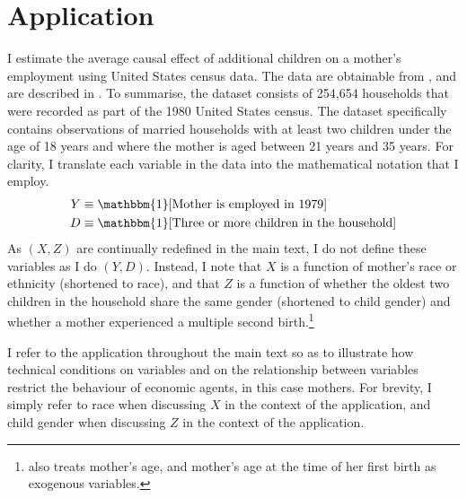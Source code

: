 \documentclass[12pt,a4paper,twoside]{article}
\newcommand{\US}{United States}
\numberwithin{equation}{section}
\begin{document}
\section*{Application}
I estimate the average causal effect of additional children on a mother's employment using {\US} census data. The data are obtainable from \cite{Angristdatabank}, and are described in \cite{ae98}. To summarise, the dataset consists of 254,654 households that were recorded as part of the 1980 {\US} census. The dataset specifically contains observations of married households with at least two children under the age of 18 years and where the mother is aged between 21 years and 35 years. For clarity, I translate each variable in the data into the mathematical notation that I employ.
\begin{align*}
Y&\equiv\mathbbm{1}[\text{Mother is employed in 1979}]\\
D&\equiv\mathbbm{1}[\text{Three or more children in the household}]
\end{align*}
As $(X,Z)$ are continually redefined in the main text, I do not define these variables as I do $(Y,D)$. Instead, I note that $X$ is a function of mother's race or ethnicity (shortened to race), and that $Z$ is a function of whether the oldest two children in the household share the same gender (shortened to child gender) and whether a mother experienced a multiple second birth.\footnote{\cite{ae98} also treats mother's age, and mother's age at the time of her first birth as exogenous variables.}

I refer to the application throughout the main text so as to illustrate how technical conditions on variables and on the relationship between variables restrict the behaviour of economic agents, in this case mothers. For brevity, I simply refer to race when discussing $X$ in the context of the application, and child gender when discussing $Z$ in the context of the application.
\end{document}
